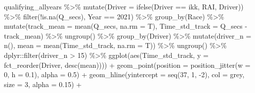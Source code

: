 \documentclass[
]{book}
\newenvironment{Shaded}{\begin{snugshade}}{\end{snugshade}}
\newcommand{\AttributeTok}[1]{\textcolor[rgb]{0.77,0.63,0.00}{#1}}
\newcommand{\DecValTok}[1]{\textcolor[rgb]{0.00,0.00,0.81}{#1}}
\newcommand{\FloatTok}[1]{\textcolor[rgb]{0.00,0.00,0.81}{#1}}
\newcommand{\FunctionTok}[1]{\textcolor[rgb]{0.00,0.00,0.00}{#1}}
\newcommand{\NormalTok}[1]{#1}
\newcommand{\SpecialCharTok}[1]{\textcolor[rgb]{0.00,0.00,0.00}{#1}}
\newcommand{\StringTok}[1]{\textcolor[rgb]{0.31,0.60,0.02}{#1}}
\begin{document}
\begin{Shaded}
\begin{Highlighting}[]
\NormalTok{qualifying\_allyears }\SpecialCharTok{\%\textgreater{}\%}
  \FunctionTok{mutate}\NormalTok{(}\AttributeTok{Driver =} \FunctionTok{ifelse}\NormalTok{(Driver }\SpecialCharTok{==} \StringTok{\textquotesingle{}ikk\textquotesingle{}}\NormalTok{, }\StringTok{\textquotesingle{}RAI\textquotesingle{}}\NormalTok{, Driver)) }\SpecialCharTok{\%\textgreater{}\%} 
  \FunctionTok{filter}\NormalTok{(}\SpecialCharTok{!}\FunctionTok{is.na}\NormalTok{(Q\_secs),}
\NormalTok{         Year }\SpecialCharTok{==} \DecValTok{2021}\NormalTok{) }\SpecialCharTok{\%\textgreater{}\%}
  \FunctionTok{group\_by}\NormalTok{(Race) }\SpecialCharTok{\%\textgreater{}\%}
  \FunctionTok{mutate}\NormalTok{(}\AttributeTok{track\_mean =} \FunctionTok{mean}\NormalTok{(Q\_secs, }\AttributeTok{na.rm =}\NormalTok{ T),}
         \AttributeTok{Time\_std\_track =}\NormalTok{ Q\_secs }\SpecialCharTok{{-}}\NormalTok{ track\_mean) }\SpecialCharTok{\%\textgreater{}\%} 
  \FunctionTok{ungroup}\NormalTok{() }\SpecialCharTok{\%\textgreater{}\%} 
  \FunctionTok{group\_by}\NormalTok{(Driver) }\SpecialCharTok{\%\textgreater{}\%} 
  \FunctionTok{mutate}\NormalTok{(}\AttributeTok{driver\_n =} \FunctionTok{n}\NormalTok{(),}
         \AttributeTok{mean =} \FunctionTok{mean}\NormalTok{(Time\_std\_track, }\AttributeTok{na.rm =}\NormalTok{ T)) }\SpecialCharTok{\%\textgreater{}\%}
  \FunctionTok{ungroup}\NormalTok{() }\SpecialCharTok{\%\textgreater{}\%}
\NormalTok{  dplyr}\SpecialCharTok{::}\FunctionTok{filter}\NormalTok{(driver\_n }\SpecialCharTok{\textgreater{}} \DecValTok{15}\NormalTok{) }\SpecialCharTok{\%\textgreater{}\%} 
  \FunctionTok{ggplot}\NormalTok{(}\FunctionTok{aes}\NormalTok{(Time\_std\_track, }\AttributeTok{y =} \FunctionTok{fct\_reorder}\NormalTok{(Driver, }\FunctionTok{desc}\NormalTok{(mean)))) }\SpecialCharTok{+}
  \FunctionTok{geom\_point}\NormalTok{(}\AttributeTok{position =} \FunctionTok{position\_jitter}\NormalTok{(}\AttributeTok{w =} \DecValTok{0}\NormalTok{, }\AttributeTok{h =} \FloatTok{0.1}\NormalTok{), }\AttributeTok{alpha =} \FloatTok{0.5}\NormalTok{) }\SpecialCharTok{+}
  \FunctionTok{geom\_hline}\NormalTok{(}\AttributeTok{yintercept =} \FunctionTok{seq}\NormalTok{(}\DecValTok{37}\NormalTok{, }\DecValTok{1}\NormalTok{, }\SpecialCharTok{{-}}\DecValTok{2}\NormalTok{), }\AttributeTok{col =} \StringTok{\textquotesingle{}grey\textquotesingle{}}\NormalTok{, }\AttributeTok{size =} \DecValTok{3}\NormalTok{, }\AttributeTok{alpha =} \FloatTok{0.15}\NormalTok{) }\SpecialCharTok{+}

\end{Highlighting}
\end{Shaded}
\end{document}
